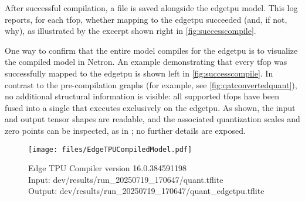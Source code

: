 {After successful compilation, a  file is saved alongside the \gls{edgetpu} model.
This log reports, for each \gls{tfop}, whether mapping to the \gls{edgetpu} succeeded (and, if not, why),
as illustrated by the  excerpt shown right in \autoref{fig:successcompile}.

One way to confirm that the entire model compiles for the \gls{edgetpu} is to visualize the compiled model in Netron.
An example demonstrating that every \gls{tfop} was successfully mapped to the \gls{edgetpu} is shown left in \autoref{fig:successcompile}.
In contrast to the pre-compilation graphs (for example, see \autoref{fig:qatconvertedquant}), no additional structural information is visible:
all supported \glspl{tfop} have been fused into a single  that executes exclusively on the \gls{edgetpu}.
As shown, the input and output tensor shapes are readable, and the associated quantization scales and zero points can be inspected,
as in ; no further details are exposed.

\begin{figure}[htbp]
\begin{minipage}[t]{0.26\textwidth}\vspace{0pt} %
    \centering
    \texttt{[image: files/EdgeTPUCompiledModel.pdf]}
\end{minipage}%
\hspace{0.5cm plus 1fill} %
\begin{minipage}[t]{0.74\textwidth}\vspace{0pt}
    \vspace*{\fill}        %
    \raggedright           %
    \small

    Edge TPU Compiler version 16.0.384591198\\
    Input: dev/results/run\_20250719\_170647/quant.tflite\\
    Output: dev/results/run\_20250719\_170647/quant\_edgetpu.tflite\\


\end{minipage}
\end{figure}}
